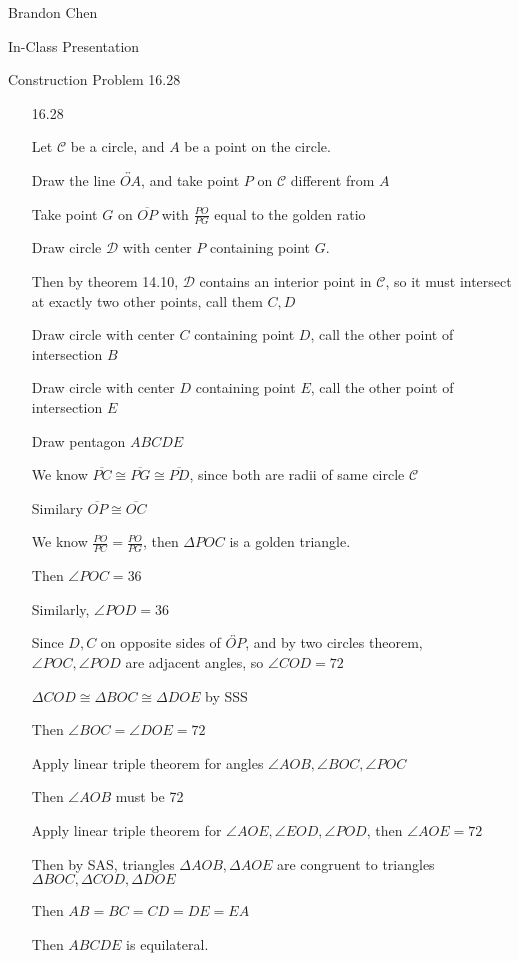 \documentclass[11pt]{article}
\newcommand{\lines}[1]{\overleftrightarrow{#1}}
\newcommand{\segment}[1]{\overline{#1}}
\begin{document}
\noindent Brandon Chen

\noindent In-Class Presentation

\noindent Construction Problem 16.28

\begin{itemize}

	\item[16.28]

		Let $\mathscr{C}$ be a circle, and $A$ be a point on the circle.

		Draw the line $\lines{OA}$, and take point $P$ on $\mathscr{C}$ different from $A$

		Take point $G$ on $\segment{OP}$ with $\frac{PO}{PG}$ equal to the golden ratio

		Draw circle $\mathscr{D}$ with center $P$ containing point $G$.

		Then by theorem 14.10, $\mathscr{D}$ contains an interior point in $\mathscr{C}$, so it must intersect at exactly two other points, call them $C,D$

		Draw circle with center $C$ containing point $D$, call the other point of intersection $B$

		Draw circle with center $D$ containing point $E$, call the other point of intersection $E$

		Draw pentagon $ABCDE$

		We know $\segment{PC} \cong \segment{PG} \cong \segment{PD}$, since both are radii of same circle $\mathscr{C}$

		Similary $\segment{OP} \cong \segment{OC}$

		We know $\frac{PO}{PC} = \frac{PO}{PG}$, then $\Delta POC$ is a golden triangle.

		Then $\angle POC = 36$

		Similarly, $\angle POD = 36$

		Since $D,C$ on opposite sides of $\lines{OP}$, and by two circles theorem, $\angle POC, \angle POD$ are adjacent angles, so $\angle COD = 72$

		$\Delta COD \cong \Delta BOC \cong \Delta DOE$ by SSS

		Then $\angle BOC = \angle DOE = 72$

		Apply linear triple theorem for angles $\angle AOB, \angle BOC, \angle POC$

		Then $\angle AOB$ must be 72

		Apply linear triple theorem for $\angle AOE, \angle EOD, \angle POD$, then $\angle AOE = 72$

		Then by SAS, triangles $\Delta AOB, \Delta AOE$ are congruent to triangles $\Delta BOC, \Delta COD, \Delta DOE$

		Then $AB = BC = CD = DE = EA$

		Then $ABCDE$ is equilateral.

\end{itemize}
\end{document}
